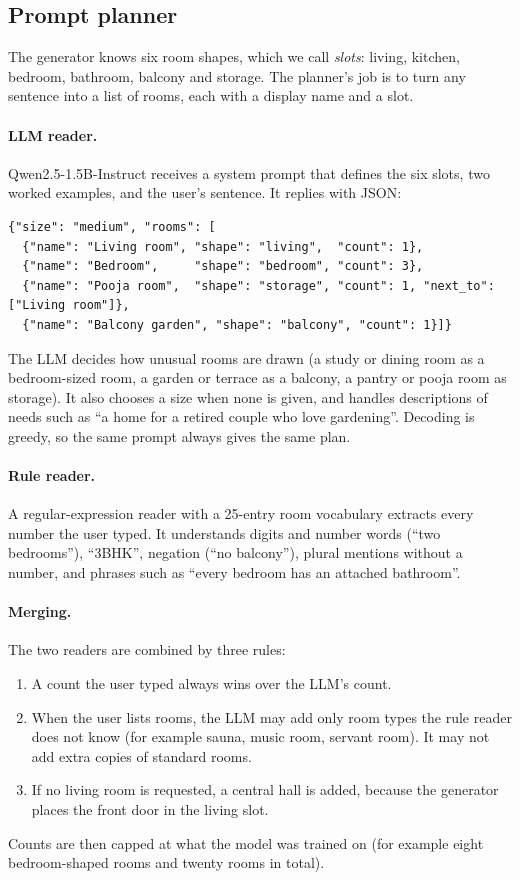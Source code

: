 \documentclass[11pt,a4paper]{article}
\begin{document}
\subsection{Prompt planner}\label{sec:planner}
The generator knows six room shapes, which we call \emph{slots}: living, kitchen,
bedroom, bathroom, balcony and storage. The planner's job is to turn any sentence
into a list of rooms, each with a display name and a slot.

\paragraph{LLM reader.} Qwen2.5-1.5B-Instruct receives a system prompt that
defines the six slots, two worked examples, and the user's sentence. It replies
with JSON:
\begin{lstlisting}
{"size": "medium", "rooms": [
  {"name": "Living room", "shape": "living",  "count": 1},
  {"name": "Bedroom",     "shape": "bedroom", "count": 3},
  {"name": "Pooja room",  "shape": "storage", "count": 1, "next_to": ["Living room"]},
  {"name": "Balcony garden", "shape": "balcony", "count": 1}]}
\end{lstlisting}
The LLM decides how unusual rooms are drawn (a study or dining room as a
bedroom-sized room, a garden or terrace as a balcony, a pantry or pooja room as
storage). It also chooses a size when none is given, and handles descriptions of
needs such as ``a home for a retired couple who love gardening''. Decoding is
greedy, so the same prompt always gives the same plan.

\paragraph{Rule reader.} A regular-expression reader with a 25-entry room
vocabulary extracts every number the user typed. It understands digits and
number words (``two bedrooms''), ``3BHK'', negation (``no balcony''), plural
mentions without a number, and phrases such as ``every bedroom has an attached
bathroom''.

\paragraph{Merging.} The two readers are combined by three rules:
\begin{enumerate}
  \item A count the user typed always wins over the LLM's count.
  \item When the user lists rooms, the LLM may add only room types the rule reader
        does not know (for example sauna, music room, servant room). It may not add
        extra copies of standard rooms.
  \item If no living room is requested, a central hall is added, because the
        generator places the front door in the living slot.
\end{enumerate}
Counts are then capped at what the model was trained on (for example eight
bedroom-shaped rooms and twenty rooms in total).
\end{document}
